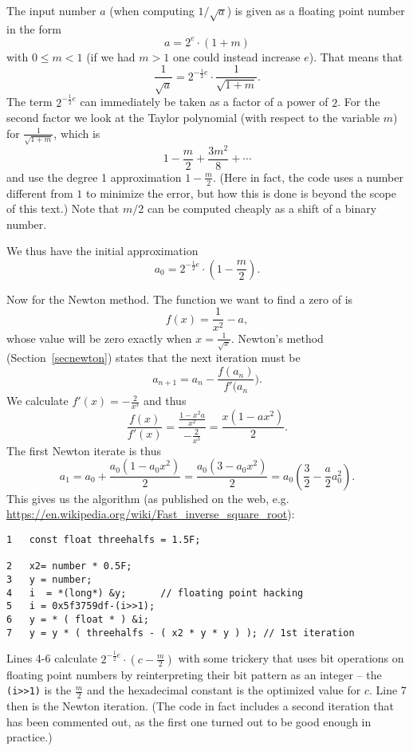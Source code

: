 \begin{bsp}
The input number $a$ (when computing $1/\sqrt{a}$)
is given as a floating point number in the form
\[
a=2^e\cdot(1+m)
\]
with $0\le m<1$ (if we had $m>1$ one could instead increase $e$).
That means that
\[
\frac{1}{\sqrt{a}}=2^{-\frac12e}\cdot\frac{1}{\sqrt{1+m}}.
\]
The term $2^{-\frac12e}$ can immediately be taken as a factor of a power of
$2$. For the second factor we look at the Taylor polynomial (with respect to
the variable $m$) for $\frac{1}{\sqrt{1+m}}$, which is
\[
1-\frac{m}{2}+\frac{3m^2}{8}+\cdots
\]
and use the degree 1 approximation $1-\frac{m}{2}$. (Here in fact, the
code uses a number different from $1$ to minimize the error, but
how this is done is beyond the scope of this text.) Note that $m/2$ can be
computed cheaply as a shift of a binary number.

We thus have the initial approximation
\[
a_0=2^{-\frac12e}\cdot\left(1-\frac{m}2\right).
\]

Now for the Newton method. The function we want to find a zero of is
\[
f(x)=\frac{1}{x^2}-a,
\]
whose value will be zero exactly when
$x=\frac1{\sqrt{x}}$. Newton's method (Section~\ref{secnewton}) states that
the next iteration must be
\[
a_{n+1}=a_n-\frac{f(a_n)}{f'(a_n}).
\]
We calculate $f'(x)=-\frac{2}{x^3}$ and thus
\[
\frac{f(x)}{f'(x)}=\frac{\frac{1-x^2a}{x^2}}{-\frac{2}{x^3}}
=\frac{x(1-ax^2)}{2}.
\]
The first Newton iterate is thus
\[
a_1=a_0+\frac{a_0(1-a_0x^2)}{2}
=\frac{a_0(3-a_0x^2)}{2}=a_0\left(\frac{3}{2}-\frac{a}{2}a_0^2\right).
\]
This gives us the algorithm (as published on the web, e.g.
\url{https://en.wikipedia.org/wiki/Fast_inverse_square_root}):
\begin{verbatim}
1   const float threehalfs = 1.5F;

2   x2= number * 0.5F;
3   y = number;
4   i  = *(long*) &y;      // floating point hacking
5   i = 0x5f3759df-(i>>1);
6   y = * ( float * ) &i;
7   y = y * ( threehalfs - ( x2 * y * y ) ); // 1st iteration
\end{verbatim}
Lines 4-6 calculate $2^{-\frac12e}\cdot\left(c-\frac{m}2\right)$ with some
trickery that uses bit operations on floating point numbers by reinterpreting
their bit pattern as an integer -- the
\texttt{(i>>1)} is the $\frac{m}{2}$ and the hexadecimal constant is the
optimized value for $c$.
Line 7 then is the Newton iteration. (The code in fact includes a second
iteration that has been commented out, as the first one turned out to be good
enough in practice.)
\end{bsp}

